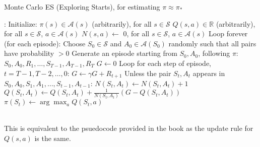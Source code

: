 \documentclass[11pt]{article}
\begin{document}
    \begin{algorithm}
        \caption{Monte Carlo ES (Exploring Starts), for estimating $\pi \approx \pi_{*}$}
        \label{alg:monte-carlo-es}
        \begin{algorithmic}[1]
            :
                \State Initialize:
                \Statex \hspace*{26pt} $\pi(s) \in \mathcal{A}(s)$ (arbitrarily), for all $s \in \mathcal{S}$
                \Statex \hspace*{26pt} $Q(s, a) \in \mathbb{R}$ (arbitrarily), for all $s \in \mathcal{S}$, $a \in \mathcal{A}(s)$
                \Statex \hspace*{26pt} $N(s, a) \leftarrow$ 0, for all $s \in \mathcal{S}$, $a \in \mathcal{A}(s)$
                \State Loop forever (for each episode):
                \State \hspace*{26pt} Choose $S_{0} \in \mathcal{S}$ and $A_{0} \in \mathcal{A}(S_{0})$ randomly such that
                all pairs have probability $> 0$
                \State \hspace*{26pt} Generate an episode starting from $S_{0}, A_{0}$, following $\pi$: $S_{0}, A_{0}, R_{1}, \dots, S_{T-1}, A_{T-1}, R_{T}$
                \State \hspace*{26pt} $G \leftarrow 0$
                \State \hspace*{26pt} Loop for each step of episode, $t = T-1, T-2, \dots, 0$:
                \State \hspace*{39pt} $G \leftarrow \gamma G + R_{t+1}$
                \State \hspace*{39pt} Unless the pair $S_{t}, A_{t}$ appears in $S_{0}, A_{0}, S_{1}, A_{1}, \dots, S_{t-1}, A_{t-1}$:
                \State \hspace*{52pt} $N(S_{t}, A_{t}) \leftarrow N(S_{t}, A_{t}) + 1$
                \State \hspace*{52pt} $Q(S_{t}, A_{t}) \leftarrow Q(S_{t}, A_{t}) + \frac{1}{N(S_{t}, A_{t})} \left(G - Q(S_{t}, A_{t}) \right)$ \label{line:update}
                \State \hspace*{52pt} $\pi(S_{t}) \leftarrow \arg\max_{a}Q(S_{t}, a)$
            \EndProcedure
        \end{algorithmic}
    \end{algorithm}
    \vspace*{0pt} \\
    This is equivalent to the psuedocode provided in the book as the update rule for $Q(s, a)$ is the same.
\end{document}
